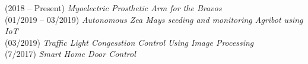 \documentclass[a4paper,12pt]{memoir} %
\begin{document}
\Sep %




{(2018 – Present) \textit{Myoelectric Prosthetic Arm for the Bravos}}\\

{(01/2019 – 03/2019) \textit{Autonomous Zea Mays seeding and monitoring Agribot using IoT}}\\

{(03/2019) \textit{Traffic Light Congesstion Control Using Image Processing}}\\

{(7/2017) \textit{Smart Home Door Control}}\\


\Sep %






\Sep %





\end{document}
